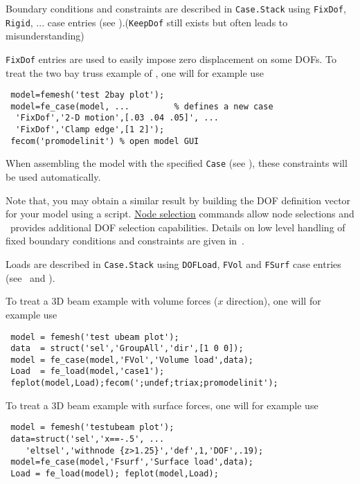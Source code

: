 Boundary conditions and constraints are described in {\tt Case.Stack} using {\tt FixDof}, {\tt Rigid}, ... case entries (see ).({\tt KeepDof} still exists but often leads to misunderstanding)

{\tt FixDof} entries are used to easily impose zero displacement on some DOFs. To treat the two bay truss example of , one will for example use

\begin{verbatim}
 model=femesh('test 2bay plot');
 model=fe_case(model, ...         % defines a new case
  'FixDof','2-D motion',[.03 .04 .05]', ... 
  'FixDof','Clamp edge',[1 2]');
 fecom('promodelinit') % open model GUI            
\end{verbatim}%

When assembling the model with the specified {\tt Case} (see ), these constraints will be used automatically.

Note that, you may obtain a similar result by building the DOF definition vector for your model using a script. \hyperlink{findnode}{Node selection} commands allow node selections and \fec\ provides additional DOF selection capabilities. Details on low level handling of fixed boundary conditions and constraints are given in~.


Loads  are described in {\tt Case.Stack} using {\tt DOFLoad}, {\tt FVol} and {\tt FSurf} case entries (see \fecase\ and ).

To treat a 3D beam example with volume forces ($x$ direction), one will for example use

\begin{verbatim}
 model = femesh('test ubeam plot');
 data  = struct('sel','GroupAll','dir',[1 0 0]);
 model = fe_case(model,'FVol','Volume load',data);
 Load  = fe_load(model,'case1');
 feplot(model,Load);fecom(';undef;triax;promodelinit');
\end{verbatim}%

To treat a 3D beam example with surface forces, one will for example use

\begin{verbatim}
 model = femesh('testubeam plot');
 data=struct('sel','x==-.5', ... 
    'eltsel','withnode {z>1.25}','def',1,'DOF',.19);
 model=fe_case(model,'Fsurf','Surface load',data);
 Load = fe_load(model); feplot(model,Load);
\end{verbatim}%

